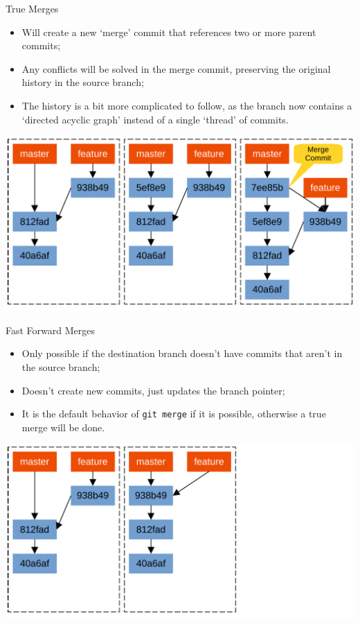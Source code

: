 \documentclass{beamer}
\begin{document}
\begin{frame}{True Merges}
  \begin{itemize}
    \item Will create a new `merge' commit that references two or more parent commits;
    \item Any conflicts will be solved in the merge commit, preserving the original history in the source branch;
    \item The history is a bit more complicated to follow, as the branch now contains a `directed acyclic graph' instead of a single `thread' of commits.
  \end{itemize}
  \begin{center}
    \includegraphics[scale=0.5]{git-true-merge}
  \end{center}
\end{frame}

\begin{frame}{Fast Forward Merges}
  \begin{itemize}
    \item Only possible if the destination branch doesn't have commits that aren't in the source branch;
    \item Doesn't create new commits, just updates the branch pointer;
    \item It is the default behavior of \texttt{git merge} if it is possible, otherwise a true merge will be done.
  \end{itemize}
  \begin{center}
    \includegraphics[scale=0.5]{git-fast-forward-merge}
  \end{center}
\end{frame}
\end{document}
